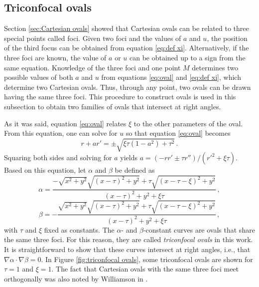 \documentclass[12pt, ams, nofootinbib]{revtex4}
\def\be{\begin{equation}}
\def\ee{\end{equation}}
\theoremstyle{definition}
\begin{document}
\subsection{Triconfocal ovals} %
\label{sec:triconfocal}
Section \ref{sec:Cartesian ovals} showed that Cartesian ovals can be related to three special points called foci. Given two foci and the values of $a$ and $u$, the position of the third focus can be obtained from equation \ref{eq:def xi}. Alternatively, if the three foci are known, the value of $a$ or $u$ can be obtained up to a sign from the same equation. Knowledge of the three foci and one point $M$ determines two possible values of both $a$ and $u$ from equations \ref{eq:oval} and \ref{eq:def xi}, which determine two Cartesian ovals. Thus, through any point, two ovals can be drawn having the same three foci. This procedure to construct ovals is used in this subsection to obtain two families of ovals that intersect at right angles. 

As it was said, equation \ref{eq:oval} relates $\xi$ to the other parameters of the oval. From this equation, one can solve for $u$ so that equation \ref{eq:oval} becomes
\be
	r+ar' = \pm \sqrt{\xi\tau(1-a^2)+\tau^2}\,.
\ee
Squaring both sides and solving for $a$ yields $a = (-rr'\pm \tau r'')/(r'^2+\xi\tau)$. Based on this equation, let $\alpha$ and $\beta$ be defined as
\be
	\alpha =  \frac{-\sqrt{x^2+y^2}\sqrt{(x-\tau)^2+y^2} + \tau \sqrt{(x-\tau-\xi)^2+y^2}}{(x-\tau)^2+y^2+\xi\tau}\,, \label{eq:alpha}
\ee
\be
	\beta = -\frac{\sqrt{x^2+y^2}\sqrt{(x-\tau)^2+y^2} + \tau \sqrt{(x-\tau-\xi)^2+y^2}}{(x-\tau)^2+y^2+\xi\tau}\,, \label{eq:beta}
\ee
with $\tau$ and $\xi$ fixed as constants. The $\alpha$- and $\beta$-constant curves are ovals that share the same three foci. For this reason, they are called \textit{triconfocal ovals} in this work. It is straightforward to show that these curves intersect at right angles, i.e., that $\nabla \alpha\cdot \nabla\beta = 0$. In Figure \ref{fig:triconfocal ovals}, some triconfocal ovals are shown for $\tau=1$ and $\xi=1$. The fact that Cartesian ovals with the same three foci meet orthogonally was also noted by Williamson in \cite{williamson1873}.
\end{document}
